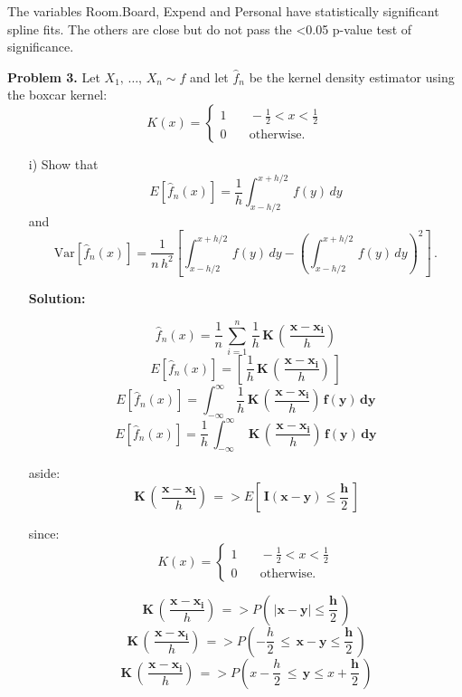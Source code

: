 \documentclass[11pt]{report}
\begin{document}
\begin{itemize}
The variables Room.Board, Expend and Personal have statistically significant spline fits. The others are close but do not pass the <0.05 p-value test of significance. 

\end{itemize}

\noindent
\newpage 
{\bf Problem 3.} Let $X_1,\,\dots,\,X_n\sim f$ and let $\widehat{f}_n$ be the kernel density estimator using the boxcar kernel: 
$$K(x)=\begin{cases}
1 & \quad -\frac{1}{2}<x<\frac{1}{2}\\
0 & \quad \text{otherwise.} 
\end{cases}$$
\begin{itemize}
\item[i) ] Show that $$E\left[ \widehat{f}_n(x)\right]=\frac{1}{h}\int_{x-h/2}^{x+h/2}\,f(y)\,dy$$
and 
$$\text{Var}\left[\widehat{f}_n(x)\right]=\dfrac{1}{n\,h^2}\left[\int_{x-h/2}^{x+h/2}\,f(y)\,dy-\left( \int_{x-h/2}^{x+h/2}\,f(y)\,dy\right)^2 \right]\,.$$

{\bf Solution:}

$$ \widehat{f}_n(x) = \frac{1}{n}\,\sum\limits_{i=1}^n\,\frac{1}{h}\,\mathbf{K}\,\left(\,\frac{\mathbf{x - x_i}}{h}\right) $$
$$ E\left[\widehat{f}_n(x) \right] = \left[\,\frac{1}{h}\,\mathbf{K}\,\left(\,\frac{\mathbf{x - x_i}}{h}\right)\,\right] $$
$$ E\left[\widehat{f}_n(x) \right] = \int_{-\infty}^{\infty} \,\frac{1}{h}\,\mathbf{K}\,\left(\,\frac{\mathbf{x - x_i}}{h}\right)\,\mathbf{f(y)}\,\mathbf{dy} $$
$$ E\left[\widehat{f}_n(x) \right] = \frac{1}{h}\,\int_{-\infty}^{\infty} \,\,\mathbf{K}\,\left(\,\frac{\mathbf{x - x_i}}{h}\right)\,\mathbf{f(y)}\,\mathbf{dy} $$

aside:
$$\,\mathbf{K}\,\left(\,\frac{\mathbf{x - x_i}}{h}\right)\, => E\left[\,\mathbf{I(x-y)} \leq \frac{\mathbf{h}}{2}\,\right] $$

since: $$K(x)=\begin{cases}
1 & \quad -\frac{1}{2}<x<\frac{1}{2}\\
0 & \quad \text{otherwise.} 
\end{cases}$$

$$\,\mathbf{K}\,\left(\,\frac{\mathbf{x - x_i}}{h}\right)\, => P\left(\,\mathbf{|x-y|} \leq \frac{\mathbf{h}}{2}\,\right) $$
$$\,\mathbf{K}\,\left(\,\frac{\mathbf{x - x_i}}{h}\right)\, => P\left(-\frac{h}{2}\,\leq\,\mathbf{x-y} \leq \frac{\mathbf{h}}{2}\,\right) $$
$$\,\mathbf{K}\,\left(\,\frac{\mathbf{x - x_i}}{h}\right)\, => P\left(x-\frac{h}{2}\,\leq\,\mathbf{y} \leq x +\frac{\mathbf{h}}{2}\,\right) $$


\end{itemize}
\end{document}
